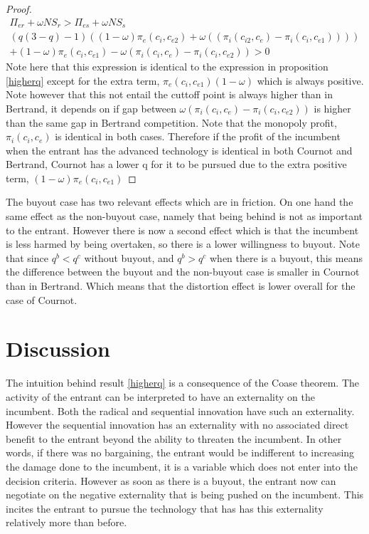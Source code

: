 \documentclass[11pt]{article}
\begin{document}
\begin{proof}
\begin{align*}
\Pi_{er} + \omega NS_{r}
> \Pi_{es} + \omega NS_{s} \\
(q  (3-q)-1)((1-\omega)\pi_{e}(c_i,c_{e2})+\omega((\pi_{i}(c_{i2},c_{e})-\pi_{i}(c_i,c_{e1})))) \\
+(1-\omega)\pi_{e}(c_i,c_{e1})
-\omega(\pi_{i}(c_i,c_{e}) 
-\pi_{i}(c_{i},c_{e2}))>0
\end{align*} 
Note here that this expression is identical to the expression in proposition \ref{higherq} except for the extra term, $\pi_{e}(c_i,c_{e1})(1-\omega)$ which is always positive. Note however that this not entail the cuttoff point is always higher than in Bertrand, it depends on if gap between $\omega(\pi_{i}(c_i,c_{e}) 
-\pi_{i}(c_{i},c_{e2}))$ is higher than the same gap in Bertrand competition. Note that the monopoly profit,$\pi_{i}(c_i,c_{e})$ is identical in both cases. Therefore if the profit of the incumbent when the entrant has the advanced technology is identical in both Cournot and Bertrand, Cournot has a lower q for it to be pursued due to the extra positive term, $(1-\omega) \pi_e(c_i,c_{e1})$ 
\end{proof}

The buyout case has two relevant effects which are in friction. On one hand the same effect as the non-buyout case, namely that being behind is not as important to the entrant. However there is now a second effect which is that the incumbent is less harmed by being overtaken, so there is a lower willingness to buyout. Note that since $q^b<q^c$ without buyout, and $q^b>q^c$ when there is a buyout, this means the difference between the buyout and the non-buyout case is smaller in Cournot than in Bertrand. Which means that the distortion effect is lower overall for the case of Cournot. 

\section{Discussion}\label{discussion}

The intuition behind result \ref{higherq} is a consequence of the Coase theorem. The activity of the entrant can be interpreted to have an externality on the incumbent. Both the radical and sequential innovation have such an externality. However the sequential innovation has an externality with no associated direct benefit to the entrant beyond the ability to threaten the incumbent. In other words, if there was no bargaining, the entrant would be indifferent to increasing the damage done to the incumbent, it is a variable which does not enter into the decision criteria. However as soon as there is a buyout, the entrant now can negotiate on the negative externality that is being pushed on the incumbent. This incites the entrant to pursue the technology that has has this externality relatively more than before. 
\end{document}

